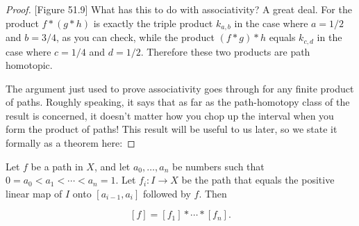 \begin{proof}
[Figure 51.9]
What has this to do with associativity? A great deal. For the product \(f * ( {g * h})\) is exactly the triple product \(k_{a,b}\) in the case where \(a = 1/2\) and \(b = 3/4\), as you can check, while the product \(( {f * g}) * h\) equals \(k_{c,d}\) in the case where \(c = 1/4\) and \(d = 1/2\). Therefore these two products are path homotopic.

The argument just used to prove associativity goes through for any finite product of paths. Roughly speaking, it says that as far as the path-homotopy class of the result is concerned, it doesn't matter how you chop up the interval when you form the product of paths! This result will be useful to us later, so we state it formally as a theorem here:
\end{proof}
\begin{theorem}
\label{thm:\thetheorem}
Let \(f\) be a path in \(X\), and let \(a_{0},\ldots ,a_{n}\) be numbers such that \(0 = a_{0} < a_{1} < \cdots < a_{n} = 1\). Let \(f_{i} : I \rightarrow X\) be the path that equals the positive linear map of \(I\) onto \([ {a_{i - 1},a_{i}}]\) followed by \(f\). Then

\[
[ f] = [ f_{1}] * \cdots * [ f_{n}] .
\]
\end{theorem}

